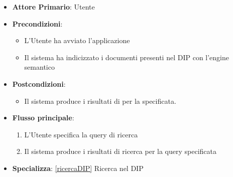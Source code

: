 \begin{itemize}
    \item \textbf{Attore Primario}: Utente
    \item \textbf{Precondizioni}:
    \begin{itemize}
      \item L'Utente ha avviato l'applicazione
      \item Il sistema ha indicizzato i documenti presenti nel DIP con l'engine semantico
    \end{itemize}
    \item \textbf{Postcondizioni}:
    \begin{itemize}
        \item Il sistema produce i risultati di  per la  specificata.
    \end{itemize}
    \item \textbf{Flusso principale}:
    \begin{enumerate}
        \item L'Utente specifica la query di ricerca
        \item Il sistema produce i risultati di ricerca per la query specificata
    \end{enumerate}
    \item \textbf{Specializza}: \ref{ricercaDIP} Ricerca nel DIP
    
\end{itemize}

